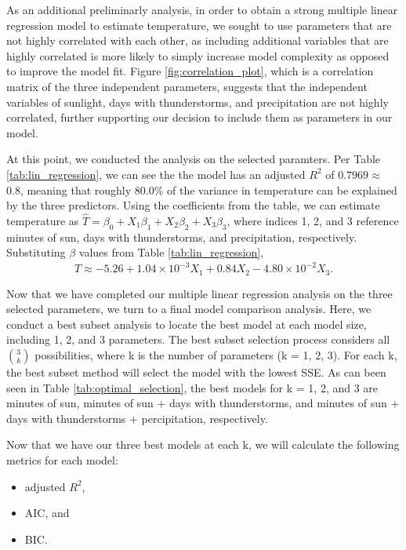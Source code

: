 As an additional preliminarly analysis, in order to obtain a strong multiple linear regression model to estimate temperature, we sought to use parameters that are not highly correlated with each other, as including additional variables that are highly correlated is more likely to simply increase model complexity as opposed to improve the model fit. Figure \ref{fig:correlation_plot}, which is a correlation matrix of the three independent parameters, suggests that the independent variables of sunlight, days with thunderstorms, and precipitation are not highly correlated, further supporting our decision to include them as parameters in our model.

At this point, we conducted the analysis on the selected paramters. Per Table \ref{tab:lin_regression}, we can see the the model has an adjusted $R^{2}$ of $0.7969 \approx$ 0.8, meaning that roughly 80.0\% of the variance in temperature can be explained by the three predictors. Using the coefficients from the table, we can estimate temperature as $\hat{T} = \beta_{0} + X_{1}\beta_{1} + X_{2}\beta_{2} + X_{3}\beta_{3}$, where indices 1, 2, and 3 reference minutes of sun, days with thunderstorms, and precipitation, respectively. Substituting $\beta$ values from Table \ref{tab:lin_regression}, $$\hat{T} \approx -5.26 + 1.04 \times 10^{-3}X_{1} + 0.84X_{2} - 4.80\times 10^{-2}X_{3}.$$

Now that we have completed our multiple linear regression analysis on the three selected parameters, we turn to a final model comparison analysis. Here, we conduct a best subset analysis to locate the best model at each model size, including 1, 2, and 3 parameters. The best subset selection process considers all $3 \choose k$ possibilities, where k is the number of parameters (k = 1, 2, 3). For each k, the best subset method will select the model with the lowest SSE. As can been seen in Table \ref{tab:optimal_selection}, the best models for k = 1, 2, and 3 are minutes of sun, minutes of sun + days with thunderstorms, and minutes of sun + days with thunderstorms + percipitation, respectively.

Now that we have our three best models at each k, we will calculate the following metrics for each model: 

\begin{itemize}
	\item adjusted $R^{2}$,
	\item AIC, and
	\item BIC.
\end{itemize}

